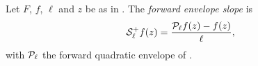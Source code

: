 \begin{definition}
Let $F$, $f$, $\ell$ and $z$ be as in . The \emph{forward
envelope slope} is
\[
  \mathcal{S}_\ell^+f(z)=\frac{\mathcal{P}_\ell f(z)-f(z)}{\ell},
\]
with $\mathcal{P}_\ell$ the forward quadratic envelope of .
\end{definition}
